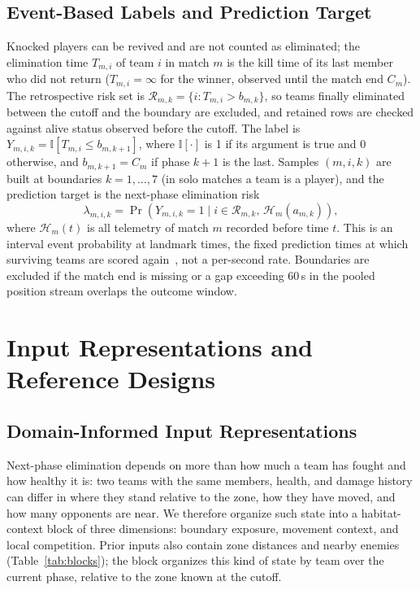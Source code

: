\documentclass[sigconf,anonymous]{acmart}
\begin{document}
\subsection{Event-Based Labels and Prediction Target}
\label{sec:method:labels}
Knocked players can be revived and are not counted as eliminated; the elimination time $T_{m,i}$ of team $i$ in match $m$ is the kill time of its last member who did not return ($T_{m,i}=\infty$ for the winner, observed until the match end $C_m$). The retrospective risk set is $\mathcal{R}_{m,k}=\{i:T_{m,i}>b_{m,k}\}$, so teams finally eliminated between the cutoff and the boundary are excluded, and retained rows are checked against alive status observed before the cutoff. The label is $Y_{m,i,k}=\mathbb{I}[T_{m,i}\le b_{m,k+1}]$, where $\mathbb{I}[\cdot]$ is 1 if its argument is true and 0 otherwise, and $b_{m,k+1}=C_m$ if phase $k+1$ is the last. Samples $(m,i,k)$ are built at boundaries $k=1,\dots,7$ (in solo matches a team is a player), and the prediction target is the next-phase elimination risk
\begin{equation}
\lambda_{m,i,k}=\Pr\!\left(Y_{m,i,k}=1 \mid i\in\mathcal{R}_{m,k},\,\mathcal{H}_{m}(a_{m,k})\right),
\label{eq:hazard}
\end{equation}
where $\mathcal{H}_{m}(t)$ is all telemetry of match $m$ recorded before time $t$. This is an interval event probability at landmark times, the fixed prediction times at which surviving teams are scored again~\cite{vanHouwelingen07}, not a per-second rate. Boundaries are excluded if the match end is missing or a gap exceeding 60\,s in the pooled position stream overlaps the outcome window.

\section{Input Representations and Reference Designs}
\label{sec:method:design}
\subsection{Domain-Informed Input Representations}
\label{sec:method:representation}
Next-phase elimination depends on more than how much a team has fought and how healthy it is: two teams with the same members, health, and damage history can differ in where they stand relative to the zone, how they have moved, and how many opponents are near. We therefore organize such state into a habitat-context block of three dimensions: boundary exposure, movement context, and local competition. Prior inputs also contain zone distances and nearby enemies (Table~\ref{tab:blocks}); the block organizes this kind of state by team over the current phase, relative to the zone known at the cutoff.
\end{document}
